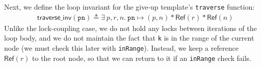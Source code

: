 \documentclass[sigplan,10pt, screen]{acmart}
\newcommand{\treerep}{\ensuremath{\mathsf{Abs}}}
\newcommand{\infp}{\ensuremath{\mathsf{Ref }}}
\newcommand{\wm}[1]{\textbf{\textcolor{violet}{[William: #1]}}}
\begin{document}


Next, we define the loop invariant for the give-up template's \texttt{traverse} function:
\begin{align*} &\mathsf{traverse\_inv}(\texttt{pn}) \triangleq \exists \ p, r, n.\ \texttt{pn} \mapsto (p, n) \ast  \infp (r) \ast \infp (n)
\end{align*}
Unlike the lock-coupling case, we do not hold any locks between iterations of the loop body, and we do not maintain the fact that \lstinline{k} is in the range of the current node (we must check this later with \lstinline{inRange}). Instead, we keep a reference $\infp(r)$ to the root node, so that we can return to it if an \lstinline{inRange} check fails.
\end{document}
